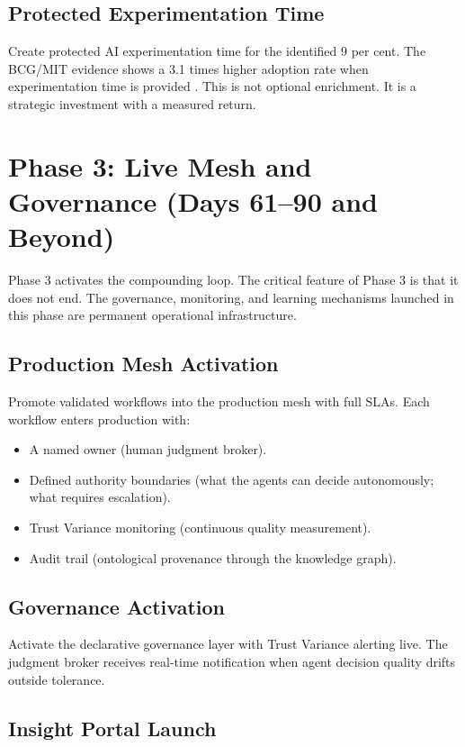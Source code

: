 \subsection{Protected Experimentation Time}

Create protected AI experimentation time for the identified 9 per cent. The BCG/MIT evidence shows a 3.1 times higher adoption rate when experimentation time is provided \parencite{BCGAIKPIs2025}. This is not optional enrichment. It is a strategic investment with a measured return.

\section{Phase 3: Live Mesh and Governance (Days 61--90 and Beyond)}

Phase 3 activates the compounding loop. The critical feature of Phase 3 is that it does not end. The governance, monitoring, and learning mechanisms launched in this phase are permanent operational infrastructure.

\subsection{Production Mesh Activation}

Promote validated workflows into the production mesh with full SLAs. Each workflow enters production with:

\begin{itemize}
  \item A named owner (human judgment broker).
  \item Defined authority boundaries (what the agents can decide autonomously; what requires escalation).
  \item Trust Variance monitoring (continuous quality measurement).
  \item Audit trail (ontological provenance through the knowledge graph).
\end{itemize}

\subsection{Governance Activation}

Activate the declarative governance layer with Trust Variance alerting live. The judgment broker receives real-time notification when agent decision quality drifts outside tolerance.

\subsection{Insight Portal Launch}


